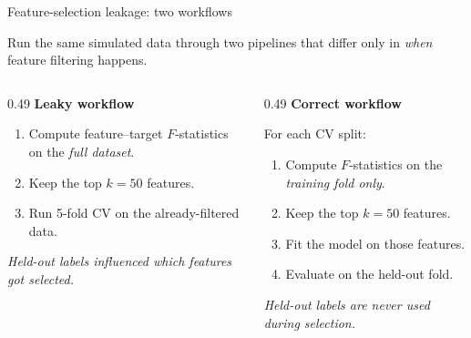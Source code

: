 \documentclass[10pt,compress,t,notes=noshow, xcolor=table]{beamer}
\begin{document}
\begin{frame}{Feature-selection leakage: two workflows}
\label{leakage-feature-selection-workflows}

Run the same simulated data through two pipelines that differ only in \emph{when} feature filtering happens.

\medskip

\begin{columns}[T, totalwidth=\textwidth]

\begin{column}{0.49\textwidth}
\textbf{\textcolor{leakred}{Leaky workflow}}

\smallskip
\colorbox{leakfill}{
\begin{minipage}{0.95\linewidth}
\begin{enumerate}
  \setlength\itemsep{0.2em}
  \item Compute feature--target $F$-statistics on the \emph{full dataset}.
  \item Keep the top $k = 50$ features.
  \item Run 5-fold CV on the already-filtered data.
\end{enumerate}
\end{minipage}}

\smallskip
\textcolor{leakred}{\itshape\footnotesize Held-out labels influenced which features got selected.}
\end{column}

\begin{column}{0.49\textwidth}
\textbf{\textcolor{cleangreen!50!black}{Correct workflow}}

\smallskip
\colorbox{cleanfill}{
\begin{minipage}{0.95\linewidth}
For each CV split:
\begin{enumerate}
  \setlength\itemsep{0.2em}
  \item Compute $F$-statistics on the \emph{training fold only}.
  \item Keep the top $k = 50$ features.
  \item Fit the model on those features.
  \item Evaluate on the held-out fold.
\end{enumerate}
\end{minipage}}

\smallskip
\textcolor{cleangreen!50!black}{\itshape\footnotesize Held-out labels are never used during selection.}
\end{column}

\end{columns}
\end{frame}
\end{document}
